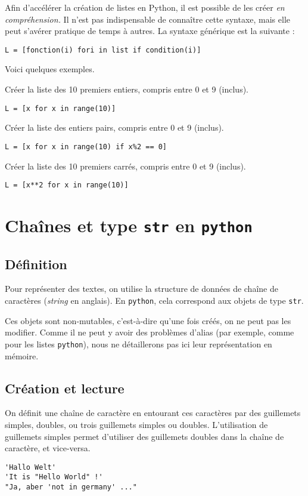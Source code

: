 Afin d'accélérer la création de listes en Python, il est possible de les créer \textit{en compréhension.} Il n'est pas indispensable de connaître cette syntaxe, mais elle peut s'avérer pratique de temps à autres.
La syntaxe générique est la suivante :

\begin{lstlisting}
L = [fonction(i) fori in list if condition(i)]
\end{lstlisting}


Voici quelques exemples. 

Créer la liste des 10 premiers entiers, compris entre 0 et 9 (inclus).
\begin{lstlisting}
L = [x for x in range(10)]
\end{lstlisting}

Créer la liste des entiers pairs, compris entre 0 et 9 (inclus).
\begin{lstlisting}
L = [x for x in range(10) if x%2 == 0]
\end{lstlisting}


Créer la liste des 10 premiers carrés, compris entre 0 et 9 (inclus).
\begin{lstlisting}
L = [x**2 for x in range(10)]
\end{lstlisting}


\section{Chaînes et type \texttt{str} en \texttt{python}}

\subsection{Définition}

Pour représenter des textes, on utilise la structure de données de \og chaîne de caractères \fg{} (\emph{string} en anglais). En \texttt{python}, cela correspond aux objets de type \texttt{str}.

Ces objets sont non-mutables, c'est-à-dire qu'une fois créés, on ne peut pas les modifier. 
Comme il ne peut y avoir des problèmes d'alias (par exemple, comme pour les listes \texttt{python}), nous ne détaillerons pas ici leur représentation en mémoire. 

\subsection{Création et lecture}

On définit une chaîne de caractère en entourant ces caractères par des guillemets simples, doubles, ou trois guillemets simples ou doubles. 
L'utilisation de guillemets simples permet d'utiliser des guillemets doubles dans la chaîne de caractère, et vice-versa.
\begin{lstlisting}
'Hallo Welt'
'It is "Hello World" !'
"Ja, aber 'not in germany' ..."
\end{lstlisting}

